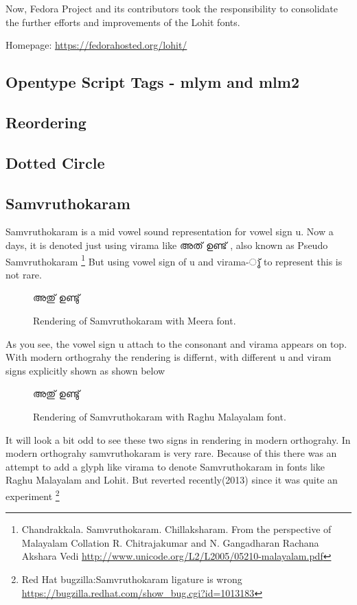 Now, Fedora Project and its contributors took the responsibility to consolidate
the further efforts and improvements of the Lohit fonts.

Homepage: {\url{https://fedorahosted.org/lohit/}}

\subsection {Opentype Script Tags - mlym and mlm2}
\subsection {Reordering}
\subsection {Dotted Circle}
\subsection {Samvruthokaram}

Samvruthokaram is a mid vowel sound representation for vowel sign u. Now a 
days, 
it is denoted just using virama like {\malayalam അത് ഉണ്ട് }, also known as 
Pseudo Samvruthokaram
\footnote{Chandrakkala. Samvruthokaram. Chillaksharam.
From the perspective of Malayalam Collation
R. Chitrajakumar and N. Gangadharan
Rachana Akshara Vedi \url{http://www.unicode.org/L2/L2005/05210-malayalam.pdf}}
But using vowel sign of u and virama-{\malayalam ു്} to represent this is not 
rare.

\begin{figure}[h]
  \centering
  {\meera\textexample  അതു് ഉണ്ടു് }\\
  \caption{Rendering of Samvruthokaram with Meera font.}
\end{figure}

As you see, the vowel sign u attach to the consonant and virama appears on top.
With modern orthograhy the rendering is differnt, with different u and viram 
signs explicitly shown as shown below

\begin{figure}[h]
  \centering
  {\raghumalayalam\textexample  അതു് ഉണ്ടു് }\\
  \caption{Rendering of Samvruthokaram with Raghu Malayalam font.}
\end{figure}

It will look a bit odd to see these two signs in rendering in modern 
orthograhy. In modern orthograhy samvruthokaram is very rare. 
Because of this there was an attempt to add a glyph like virama to denote 
Samvruthokaram in fonts like Raghu Malayalam and Lohit.
But reverted recently(2013) since it was quite an experiment
\footnote{Red Hat bugzilla:Samvruthokaram ligature is wrong 
\url{https://bugzilla.redhat.com/show_bug.cgi?id=1013183}}

